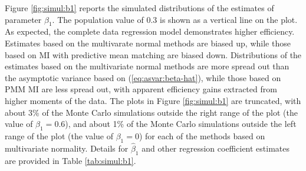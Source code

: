 \documentclass[11pt]{asaproc}
\begin{document}
Figure \ref{fig:simul:b1} reports the simulated distributions of the estimates of parameter $\beta_1$.
The population value of 0.3 is shown as a vertical line on the plot. As expected, the complete data
regression model demonstrates higher efficiency. Estimates based on the multivarate normal methods
are biased up, while those based on MI with predictive mean matching are biased down.
Distributions of the estimates based on the multivariate normal methods are more spread out
than the asymptotic variance based on (\ref{eq:asvar:beta-hat}), while those based
on PMM MI are less spread out, with apparent efficiency gains extracted from higher moments of the data.
The plots in Figure \ref{fig:simul:b1} are truncated, with about 3\% of the Monte Carlo simulations
outside the right range of the plot (the value of $\beta_1=0.6$), and about 1\% of the Monte Carlo simulations
outside the left range of the plot (the value of $\beta_1=0$) for each of the methods based on multivariate normality.
Details for $\hat\beta_1$ and other regression coefficient estimates are provided in Table \ref{tab:simul:b1}.
\end{document}
